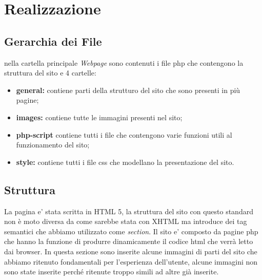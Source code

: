 \section{Realizzazione}
\subsection{Gerarchia dei File}
nella cartella principale \textit{Webpage} sono contenuti i file php che contengono la struttura del sito e 4 cartelle:
\begin{itemize}
	\item \textbf{general:} contiene parti della strutturo del sito che sono presenti in più pagine;
	\item \textbf{images:} contiene tutte le immagini presenti nel sito;
	\item \textbf{php-script} contiene tutti i file che contengono varie funzioni utili al funzionamento del sito;
	\item \textbf{style:} contiene tutti i file css che modellano la presentazione del sito.
\end{itemize}
\subsection{Struttura}
La pagina e' stata scritta in HTML 5, la struttura del sito con questo standard non è moto diversa da come sarebbe stata con XHTML ma introduce dei tag semantici che abbiamo utilizzato come \emph{section}.\newline
Il sito e' composto da pagine php che hanno la funzione di produrre dinamicamente il codice html che verrà letto dai browser.\newline
In questa sezione sono inserite alcune immagini di parti del sito che abbiamo ritenuto fondamentali per l'esperienza dell'utente, alcune immagini non sono state inserite perché ritenute troppo simili ad altre già inserite. 


